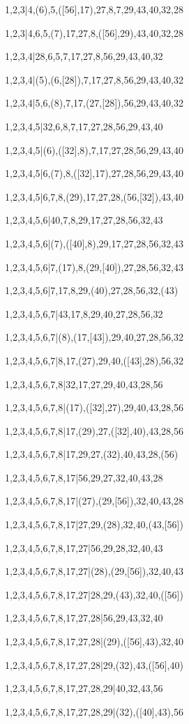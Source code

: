 \documentclass[russian]{article}
\begin{document}
1,2,3|4,(6),5,([56],17),27,8,7,29,43,40,32,28

1,2,3|4,6,5,(7),17,27,8,([56],29),43,40,32,28

1,2,3,4|28,6,5,7,17,27,8,56,29,43,40,32

1,2,3,4|(5),(6,[28]),7,17,27,8,56,29,43,40,32

1,2,3,4|5,6,(8),7,17,(27,[28]),56,29,43,40,32

1,2,3,4,5|32,6,8,7,17,27,28,56,29,43,40

1,2,3,4,5|(6),([32],8),7,17,27,28,56,29,43,40

1,2,3,4,5|6,(7),8,([32],17),27,28,56,29,43,40

1,2,3,4,5|6,7,8,(29),17,27,28,(56,[32]),43,40

1,2,3,4,5,6|40,7,8,29,17,27,28,56,32,43

1,2,3,4,5,6|(7),([40],8),29,17,27,28,56,32,43

1,2,3,4,5,6|7,(17),8,(29,[40]),27,28,56,32,43

1,2,3,4,5,6|7,17,8,29,(40),27,28,56,32,(43)

1,2,3,4,5,6,7|43,17,8,29,40,27,28,56,32

1,2,3,4,5,6,7|(8),(17,[43]),29,40,27,28,56,32

1,2,3,4,5,6,7|8,17,(27),29,40,([43],28),56,32

1,2,3,4,5,6,7,8|32,17,27,29,40,43,28,56

1,2,3,4,5,6,7,8|(17),([32],27),29,40,43,28,56

1,2,3,4,5,6,7,8|17,(29),27,([32],40),43,28,56

1,2,3,4,5,6,7,8|17,29,27,(32),40,43,28,(56)

1,2,3,4,5,6,7,8,17|56,29,27,32,40,43,28

1,2,3,4,5,6,7,8,17|(27),(29,[56]),32,40,43,28

1,2,3,4,5,6,7,8,17|27,29,(28),32,40,(43,[56])

1,2,3,4,5,6,7,8,17,27|56,29,28,32,40,43

1,2,3,4,5,6,7,8,17,27|(28),(29,[56]),32,40,43

1,2,3,4,5,6,7,8,17,27|28,29,(43),32,40,([56])

1,2,3,4,5,6,7,8,17,27,28|56,29,43,32,40

1,2,3,4,5,6,7,8,17,27,28|(29),([56],43),32,40

1,2,3,4,5,6,7,8,17,27,28|29,(32),43,([56],40)

1,2,3,4,5,6,7,8,17,27,28,29|40,32,43,56

1,2,3,4,5,6,7,8,17,27,28,29|(32),([40],43),56
\end{document}
